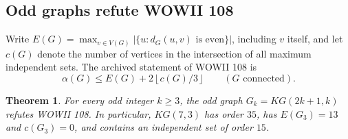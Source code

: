 \documentclass[11pt,a4paper]{article}
\newtheorem{theorem}{Theorem}[section]
\theoremstyle{remark}
\begin{document}
\subsection{Odd graphs refute WOWII 108}\label{r8:sec108}

Write $E(G)=\max_{v\in V(G)}|\{u:d_G(u,v)\text{ is even}\}|$, including
$v$ itself, and let $c(G)$ denote the number of vertices in the intersection
of all maximum independent sets.  The archived statement of WOWII 108 is
\[
 \alpha(G)\le E(G)+2\left\lfloor c(G)/3\right\rfloor
 \qquad(G\text{ connected}).
\]

\begin{theorem}
For every odd integer $k\ge3$, the odd graph $G_k=KG(2k+1,k)$ refutes
WOWII 108.  In particular, $KG(7,3)$ has order $35$, has $E(G_3)=13$ and
$c(G_3)=0$, and contains an independent set of order $15$.
\end{theorem}
\end{document}
